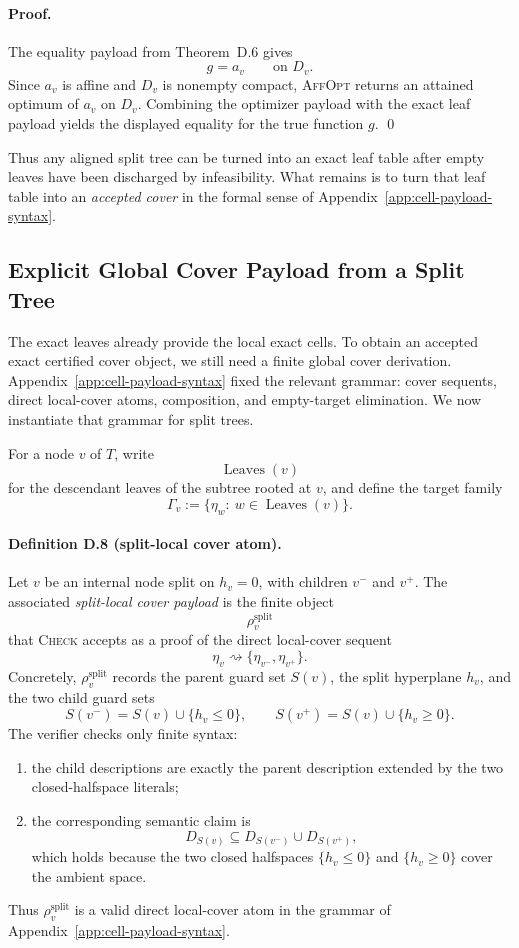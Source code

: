 \paragraph{Proof.}
The equality payload from Theorem~D.6 gives
\[
 g=a_v
 \qquad \text{on }D_v.
\]
Since $a_v$ is affine and $D_v$ is nonempty compact, \textsc{AffOpt} returns an attained optimum of $a_v$ on $D_v$. Combining the optimizer payload with the exact leaf payload yields the displayed equality for the true function $g$. \qed

Thus any aligned split tree can be turned into an exact leaf table after empty leaves have been discharged by infeasibility. What remains is to turn that leaf table into an \emph{accepted cover} in the formal sense of Appendix~\ref{app:cell-payload-syntax}.

\subsection{Explicit Global Cover Payload from a Split Tree}

The exact leaves already provide the local exact cells. To obtain an accepted exact certified cover object, we still need a finite global cover derivation. Appendix~\ref{app:cell-payload-syntax} fixed the relevant grammar: cover sequents, direct local-cover atoms, composition, and empty-target elimination. We now instantiate that grammar for split trees.

For a node $v$ of $T$, write
\[
 \operatorname{Leaves}(v)
\]
for the descendant leaves of the subtree rooted at $v$, and define the target family
\[
 \Gamma_v:=\{\eta_w:\ w\in \operatorname{Leaves}(v)\}.
\]

\paragraph{Definition D.8 (split-local cover atom).}
Let $v$ be an internal node split on $h_v=0$, with children $v^-$ and $v^+$. The associated \emph{split-local cover payload} is the finite object
\[
 \rho_v^{\mathrm{split}}
\]
that \textsc{Check} accepts as a proof of the direct local-cover sequent
\[
 \eta_v \rightsquigarrow \{\eta_{v^-},\eta_{v^+}\}.
\tag{D.4}
\]
Concretely, $\rho_v^{\mathrm{split}}$ records the parent guard set $S(v)$, the split hyperplane $h_v$, and the two child guard sets
\[
 S(v^-) = S(v)\cup\{h_v\le 0\},
 \qquad
 S(v^+) = S(v)\cup\{h_v\ge 0\}.
\]
The verifier checks only finite syntax:
\begin{enumerate}
    \item the child descriptions are exactly the parent description extended by the two closed-halfspace literals;
    \item the corresponding semantic claim is
    \[
    D_{S(v)}\subseteq D_{S(v^-) }\cup D_{S(v^+)},
    \]
    which holds because the two closed halfspaces $\{h_v\le 0\}$ and $\{h_v\ge 0\}$ cover the ambient space.
\end{enumerate}
Thus $\rho_v^{\mathrm{split}}$ is a valid direct local-cover atom in the grammar of Appendix~\ref{app:cell-payload-syntax}.

